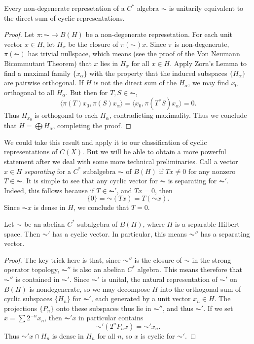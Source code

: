 \begin{theorem}
    Every non-degenerate represetation of a $C^*$ algebra $\AC$ is unitarily equivalent to the direct sum of cyclic representations.
\end{theorem}
\begin{proof}
    Let $\pi: \AC \to B(H)$ be a non-degenerate represetation. For each unit vector $x \in H$, let $H_x$ be the closure of $\pi(\AC) x$. Since $\pi$ is non-degenerate, $\pi(\AC)$ has trivial nullspace, which means (see the proof of the Von Neumann Bicommutant Theorem) that $x$ lies in $H_x$ for all $x \in H$. Apply Zorn's Lemma to find a maximal family $\{ x_\alpha \}$ with the property that the induced subspaces $\{ H_\alpha \}$ are pairwise orthogonal. If $H$ is not the direct sum of the $H_\alpha$, we may find $x_0$ orthogonal to all $H_\alpha$. But then for $T,S \in \AC$,
    \[ \langle \pi(T) x_0, \pi(S) x_\alpha \rangle = \langle x_0, \pi(T^* S) x_\alpha \rangle = 0. \]
    Thus $H_{x_0}$ is orthogonal to each $H_\alpha$, contradicting maximality. Thus we conclude that $H = \bigoplus H_\alpha$, completing the proof.
\end{proof}

We could take this result and apply it to our classification of cyclic representations of $C(X)$. But we will be able to obtain a more powerful statement after we deal with some more technical preliminaries. Call a vector $x \in H$ \emph{separating} for a $C^*$ subalgebra $\AC$ of $B(H)$ if $Tx \neq 0$ for any nonzero $T \in \AC$. It is simple to see that any cyclic vector for $\AC$ is separating for $\AC'$. Indeed, this follows because if $T \in \AC'$, and $Tx = 0$, then
%
\[ \{ 0 \} = \AC(Tx) = T(\AC x). \]
%
Since $\AC x$ is dense in $H$, we conclude that $T = 0$.

\begin{lemma}
    Let $\AC$ be an abelian $C^*$ subalgebra of $B(H)$, where $H$ is a separable Hilbert space. Then $\AC'$ has a cyclic vector. In particular, this means $\AC''$ has a separating vector.
\end{lemma}
\begin{proof}
    The key trick here is that, since $\AC''$ is the closure of $\AC$ in the strong operator topology, $\AC''$ is also an abelian $C^*$ algebra. This means therefore that $\AC''$ is contained in $\AC'$. Since $\AC'$ is unital, the natural representation of $\AC'$ on $B(H)$ is nondegenerate, so we may decompose $H$ into the orthogonal sum of cyclic subspaces $\{ H_n \}$ for $\AC'$, each generated by a unit vector $x_n \in H$. The projections $\{ P_n \}$ onto these subspaces thus lie in $\AC''$, and thus $\AC'$. If we set $x = \sum 2^{-n} x_n$, then $\AC' x$ in particular contains
    \[ \AC' (2^n P_n x) = \AC' x_n. \]
    Thus $\AC' x \cap H_n$ is dense in $H_n$ for all $n$, so $x$ is cyclic for $\AC'$.
\end{proof}

